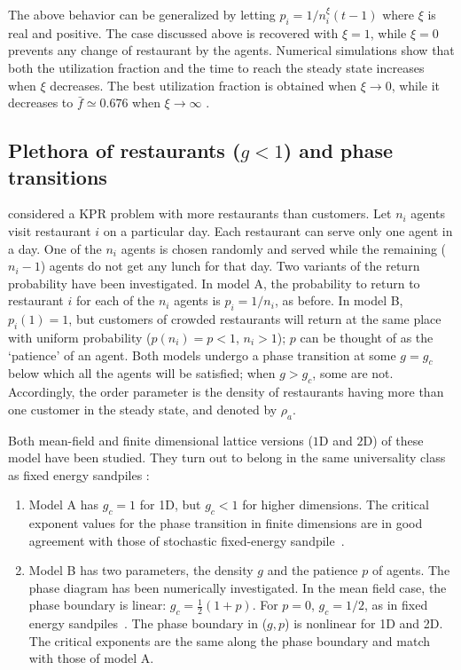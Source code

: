 \documentclass[aps,twocolumn,nofootinbib,sortedaddress,reprint]{revtex4-1}
\begin{document}
The above behavior can be generalized by letting $p_i=1/n_{i}^{\xi}(t-1)$
 where $\xi$ is real and positive. The case discussed above is recovered with $\xi=1$, while $\xi =0$ prevents any change of restaurant by the agents.  Numerical simulations show that both the utilization
fraction and the time to reach the steady state increases when $\xi$ decreases. The best utilization fraction is obtained when $\xi \to 0$, while it decreases to $\bar f \simeq
0.676$ when  $\xi \to \infty$ \cite{Ghosh2013}.

\subsection{Plethora of restaurants ($g< 1$) and phase transitions}
\label{subsec:phase}
\textcite{kpr-pre12} considered a KPR problem with more restaurants than customers.
 Let $n_i$ agents visit restaurant $i$ on a particular
day.  Each restaurant can serve only one agent in a day.  One
of the $n_i$ agents is chosen randomly and served while the remaining
($n_i-1$) agents do not get any lunch for that day.  Two variants of the return probability have been
investigated. In model A, the probability to return to restaurant $i$
 for each of the $n_i$ agents is $p_i=1/n_i$, as before.  In model B,  $p_i(1)=1$, but customers of crowded restaurants will return at the same place with uniform probability ($p(n_i)=p<1$, $n_i>1$);  $p$ can be thought of as the `patience' of an agent.
Both models undergo a phase transition at some
$g=g_c$ below which all the agents will be satisfied; when $g>g_c$,
some are not.  Accordingly, the order parameter is  the
density of restaurants having more than one customer in the steady state, and denoted by $\rho_a$.



Both mean-field and finite dimensional lattice versions ($1$D and $2$D) of these model have been studied. They turn out to belong in the same universality class as fixed energy sandpiles \cite{Vespignani}:
\begin{enumerate}


\item Model A has $g_c=1$ for 1D, but $g_c < 1$ for higher dimensions.  The
critical exponent values for the phase transition in finite dimensions
are in good agreement with those of stochastic fixed-energy
sandpile~\cite{Vespignani,Manna:1991,Lubeck:2004}.
\item  Model B has two
parameters, the density $g$ and the patience $p$ of agents.  The phase
diagram has been numerically investigated.  In the mean field case,
the phase boundary is linear: $g_c =\frac{1}{2}(1+p)$.  For $p=0$,
$g_c=1/2$, as in fixed energy sandpiles~\cite{Vespignani}.  The phase
boundary in ($g,p$) is nonlinear for 1D and 2D.  The critical
exponents are the same along the phase boundary and match with
those of model A.
\end{enumerate}
\end{document}
